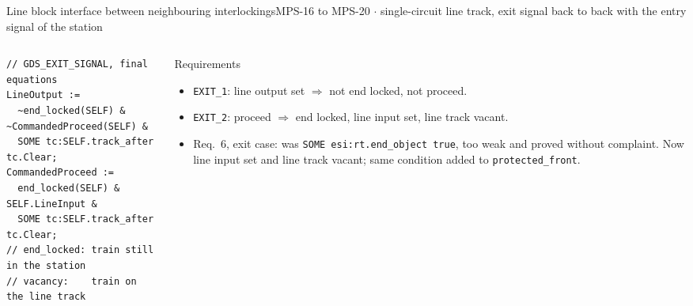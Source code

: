 \documentclass[aspectratio=169,10pt]{beamer}
\begin{document}
\begin{frame}[fragile,label=sec_extend]{Line block interface between neighbouring interlockings}{MPS-16 to MPS-20 $\cdot$ single-circuit line track, exit signal back to back with the entry signal of the station}

  \vspace{0.2mm}
  \begin{columns}[T,onlytextwidth]
    \begin{column}{0.51\textwidth}
      \begin{codebox}[top=0.5mm,bottom=0.5mm]
\begin{lstlisting}[basicstyle=\fontsize{5.9}{6.9}\ttfamily]
// GDS_EXIT_SIGNAL, final equations
LineOutput :=
  ~end_locked(SELF) & ~CommandedProceed(SELF) &
  SOME tc:SELF.track_after tc.Clear;
CommandedProceed :=
  end_locked(SELF) & SELF.LineInput &
  SOME tc:SELF.track_after tc.Clear;
// end_locked: train still in the station
// vacancy:    train on the line track
\end{lstlisting}
      \end{codebox}
    \end{column}
    \begin{column}{0.47\textwidth}
      \begin{proverbox}[top=0.5mm,bottom=0.5mm]{Requirements}
        \fontsize{6.8}{8.0}\selectfont
        \begin{itemize}
          \item \texttt{EXIT\_1}: line output set $\Rightarrow$ not end locked, not proceed.
          \item \texttt{EXIT\_2}: proceed $\Rightarrow$ end locked, line input set, line track vacant.
          \item Req.~6, exit case: was \texttt{SOME esi:rt.end\_object true}, too weak and proved without complaint. Now line input set and line track vacant; same condition added to \texttt{protected\_front}.
        \end{itemize}
      \end{proverbox}
    \end{column}
  \end{columns}
\end{frame}
\end{document}
